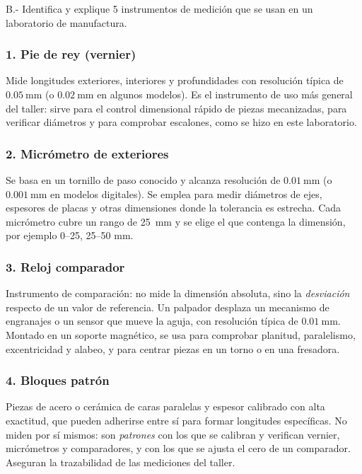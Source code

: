 \documentclass[12pt,a4paper]{article}
\begin{document}
\begin{enunciado}
	B.- Identifica y explique 5 instrumentos de medición que se usan en un
	laboratorio de manufactura.
\end{enunciado}

\subsubsection*{1. Pie de rey (vernier)}
Mide longitudes exteriores, interiores y profundidades con resolución típica de
$\SI{0.05}{\milli\metre}$ (o $\SI{0.02}{\milli\metre}$ en algunos modelos). Es
el instrumento de uso más general del taller: sirve para el control dimensional
rápido de piezas mecanizadas, para verificar diámetros y para comprobar
escalones, como se hizo en este laboratorio.

\subsubsection*{2. Micrómetro de exteriores}
Se basa en un tornillo de paso conocido y alcanza resolución de
$\SI{0.01}{\milli\metre}$ (o $\SI{0.001}{\milli\metre}$ en modelos digitales).
Se emplea para medir diámetros de ejes, espesores de placas y otras dimensiones
donde la tolerancia es estrecha. Cada micrómetro cubre un rango de
\SI{25}{\milli\metre} y se elige el que contenga la dimensión, por ejemplo
0--25, 25--50 mm.

\subsubsection*{3. Reloj comparador}
Instrumento de comparación: no mide la dimensión absoluta, sino la
\emph{desviación} respecto de un valor de referencia. Un palpador desplaza un
mecanismo de engranajes o un sensor que mueve la aguja, con resolución típica de
$\SI{0.01}{\milli\metre}$. Montado en un soporte magnético, se usa para
comprobar planitud, paralelismo, excentricidad y alabeo, y para centrar piezas
en un torno o en una fresadora.

\subsubsection*{4. Bloques patrón}
Piezas de acero o cerámica de caras paralelas y espesor calibrado con alta
exactitud, que pueden adherirse entre sí para formar longitudes específicas. No
miden por sí mismos: son \emph{patrones} con los que se calibran y verifican
vernier, micrómetros y comparadores, y con los que se ajusta el cero de un
comparador. Aseguran la trazabilidad de las mediciones del taller.
\end{document}
